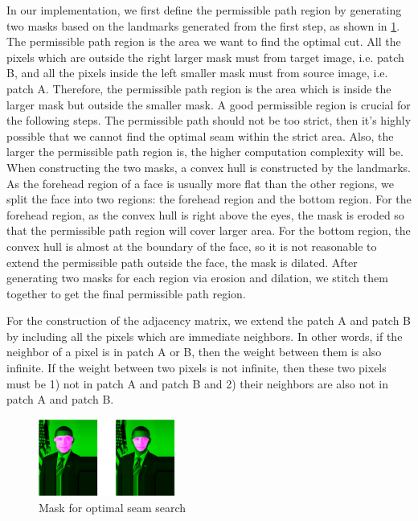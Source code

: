 \documentclass[10pt,twocolumn,letterpaper]{article}
\begin{document}
In our implementation, we first define the permissible path region by generating two masks based on the landmarks generated from the first step, as shown in \ref{seam-mask}. The permissible path region is the area we want to find the optimal cut. All the pixels which are outside the right larger mask must from target image, i.e. patch B, and all the pixels inside the left smaller mask must from source image, i.e. patch A. Therefore, the permissible path region is the area which is inside the larger mask but outside the smaller mask. A good permissible region is crucial for the following steps. The permissible path should not be too strict, then it's highly possible that we cannot find the optimal seam within the strict area. Also, the larger the permissible path region is, the higher computation complexity will be. When constructing the two masks, a convex hull is constructed by the landmarks. As the forehead region of a face is usually more flat than the other regions, we split the face into two regions: the forehead region and the bottom region. For the forehead region, as the convex hull is right above the eyes, the mask is eroded so that the permissible path region will cover larger area. For the bottom region, the convex hull is almost at the boundary of the face, so it is not reasonable to extend the permissible path outside the face, the mask is dilated. After generating two masks for each region via erosion and dilation, we stitch them together to get the final permissible path region.

For the construction of the adjacency matrix, we extend the patch A and patch B by including all the pixels which are immediate neighbors. In other words, if the neighbor of a pixel is in patch A or B, then the weight between them is also infinite. If the weight between two pixels is not infinite, then these two pixels must be 1) not in patch A and patch B and 2) their neighbors are also not in patch A and patch B.

\begin{figure}[h]
  \centering
  \includegraphics[width=0.4\textwidth]{seam_mask.eps}
  \caption{Mask for optimal seam search}\label{seam-mask}
\end{figure}
\end{document}
